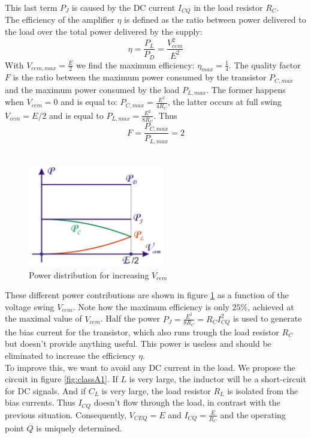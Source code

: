 This last term $P_J$ is caused by the DC current $I_{CQ}$ in the load resistor $R_C$.\\
The efficiency of the amplifier $\eta$ is defined as the ratio between power delivered to the load over the total power delivered by the supply:
\begin{equation}
	\eta = \frac{P_L}{P_D} = \frac{V_{cem}^2}{E^2}
\end{equation}
With $V_{cem, max} = \frac{E}{2}$ we find the maximum efficiency: $\eta_{max} = \frac{1}{4}$. The quality factor $F$ is the ratio between the maximum power consumed by the transistor $P_{C, max}$ and the maximum power consumed by the load $P_{L, max}$. The former happens when $V_{cem} = 0$ and is equal to: $P_{C, max} = \frac{E^2}{4R_C}$, the latter occurs at full swing $V_{cem} =E/2$ and is equal to  $P_{L, max} = \frac{E^2}{8R_C}$. Thus $$F = \frac{P_{C, max}}{P_{L, max}} = 2$$\\
\begin{figure}[h!]
	\centering
	\includegraphics[width=6cm]{figures/ch09/pa_cycle3.jpg}
	\caption{Power distribution for increasing $V_{cem}$}
	\label{fig:pa_cycle3}
\end{figure}
These different power contributions are shown in figure \ref{fig:pa_cycle3} as a function of the voltage swing $V_{cem}$. Note how the maximum efficiency is only $25\%$, achieved at the maximal value of $V_{cem}$. Half the power $P_J = \frac{E^2}{8R_C} = R_C I_{CQ}^2$ is used to generate the bias current for the transistor, which also runs trough the load resistor $R_C$ but doesn't provide anything useful. This power is useless and should be eliminated to increase the efficiency $\eta$.\\
To improve this, we want to avoid any DC current in the load. We propose the circuit in figure \ref{fig:classA1}. If $L$ is very large, the inductor will be a short-circuit for DC signals. And if $C_L$ is very large, the load resistor $R_L$ is isolated from the bias currents. Thus $I_{CQ}$ doesn't flow through the load, in contrast with the previous situation. Consequently, $V_{CEQ} = E$ and $I_{CQ} = \frac{E}{R_C}$ and the operating point $Q$ is uniquely determined.\\
